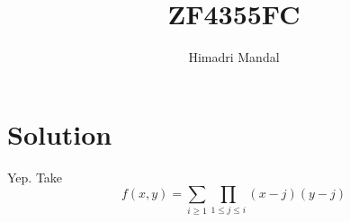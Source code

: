 \documentclass[11pt]{scrartcl}
\title{ZF4355FC}
\author{Himadri Mandal}
\begin{document}
\maketitle

\section{Solution}
Yep. Take
  \[ f(x,y) = \sum_{i \geq 1}\prod_{1 \leq j \leq i} (x-j)(y-j) \]
\end{document}
